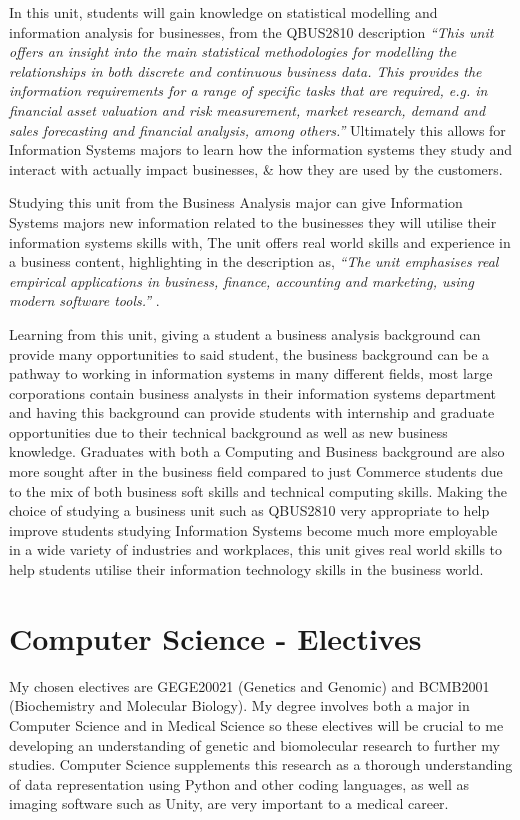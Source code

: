 In this unit, students will gain knowledge on statistical modelling and information analysis for businesses, from the QBUS2810 description \textit{“This unit offers an insight into the main statistical methodologies for modelling the relationships in both discrete and continuous business data. This provides the information requirements for a range of specific tasks that are required, e.g. in financial asset valuation and risk measurement, market research, demand and sales forecasting and financial analysis, among others.”} \cite{Usyd6} Ultimately this allows for Information Systems majors to learn how the information systems they study and interact with actually impact businesses, & how they are used by the customers.

Studying this unit from the Business Analysis major can give Information Systems majors new information related to the businesses they will utilise their information systems skills with, The unit offers real world skills and experience in a business content, highlighting in the description as, \textit{“The unit emphasises real empirical applications in business, finance, accounting and marketing, using modern software tools.”} \cite{Usyd6} .

Learning from this unit, giving a student a business analysis background can provide many opportunities to said student, the business background  can be a pathway to working in information systems in many different fields, most large corporations contain business analysts in their information systems department and having this background can provide students with internship and graduate opportunities due to their technical background as well as new business knowledge. Graduates with both a Computing and Business background are also more sought after in the business field compared to just Commerce students due to the mix of both business soft skills and technical computing skills. Making the choice of studying a business unit such as QBUS2810 very appropriate to help improve students studying Information Systems become much more employable in a wide variety of industries and workplaces, this unit gives real world skills to help students utilise their information technology skills in the business world.


\section{\textbf{Computer Science - Electives}}


My chosen electives are GEGE20021 (Genetics and Genomic) and BCMB2001 (Biochemistry and Molecular Biology). My degree involves both a major in Computer Science and in Medical Science so these electives will be crucial to me developing an understanding of genetic and biomolecular research to further my studies. Computer Science supplements this research as a thorough understanding of data representation using Python and other coding languages, as well as imaging software such as Unity, are very important to a medical career.


